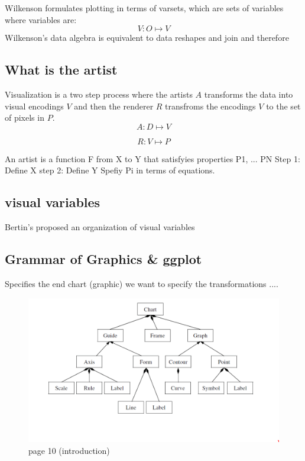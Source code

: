 \documentclass[letterpaper,onecolumn,titlepage]{Ythesis}
\begin{document}
Wilkenson formulates plotting in terms of varsets, which are sets of variables where variables are:
\begin{equation}
V:O\mapsto V    
\end{equation}
Wilkenson's data algebra is equivalent to data reshapes and join and therefore \cite{wickhamLayeredGrammarGraphics2010,wilkinsonGrammarGraphics2005}


\subsection{What is the artist}
Visualization is a two step process where the artists $A$ transforms the data into visual encodings $V$ and then the renderer $R$ transfroms the encodings $V$ to the set of pixels in $P$.
\begin{equation}
    \label{eq:artist}
    A: D \mapsto V
\end{equation}

\begin{equation}
    \label{eg:renderer}
    R: V \mapsto P
\end{equation}

An artist is a function F from X to Y
that satisfyies properties P1, ... PN
Step 1: Define X
step 2: Define Y
Spefiy Pi in terms of equations.

\subsection{visual variables}
Bertin's proposed an organization of visual variables \cite{bertinIIPropertiesGraphic2011} 


\subsection{Grammar of Graphics \& ggplot}
Specifies the end chart (graphic)
we want to specify the transformations ....
\begin{figure}
    \includegraphics{figures/intro/grammar_chart_composition.png}
    \caption{page 10 (introduction)}
\end{figure}
\end{document}
